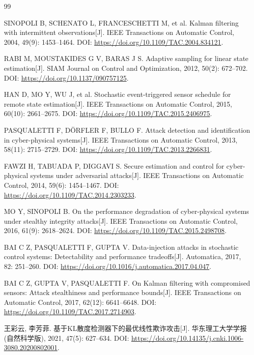 \begin{thebibliography}{99}

SINOPOLI B, SCHENATO L, FRANCESCHETTI M, et al.
Kalman filtering with intermittent observations[J].
IEEE Transactions on Automatic Control, 2004, 49(9): 1453--1464.
DOI: \url{https://doi.org/10.1109/TAC.2004.834121}.

RABI M, MOUSTAKIDES G V, BARAS J S.
Adaptive sampling for linear state estimation[J].
SIAM Journal on Control and Optimization, 2012, 50(2): 672--702.
DOI: \url{https://doi.org/10.1137/090757125}.

HAN D, MO Y, WU J, et al.
Stochastic event-triggered sensor schedule for remote state estimation[J].
IEEE Transactions on Automatic Control, 2015, 60(10): 2661--2675.
DOI: \url{https://doi.org/10.1109/TAC.2015.2406975}.

PASQUALETTI F, D\"ORFLER F, BULLO F.
Attack detection and identification in cyber-physical systems[J].
IEEE Transactions on Automatic Control, 2013, 58(11): 2715--2729.
DOI: \url{https://doi.org/10.1109/TAC.2013.2266831}.

FAWZI H, TABUADA P, DIGGAVI S.
Secure estimation and control for cyber-physical systems under adversarial attacks[J].
IEEE Transactions on Automatic Control, 2014, 59(6): 1454--1467.
DOI: \url{https://doi.org/10.1109/TAC.2014.2303233}.

MO Y, SINOPOLI B.
On the performance degradation of cyber-physical systems under stealthy integrity attacks[J].
IEEE Transactions on Automatic Control, 2016, 61(9): 2618--2624.
DOI: \url{https://doi.org/10.1109/TAC.2015.2498708}.

BAI C Z, PASQUALETTI F, GUPTA V.
Data-injection attacks in stochastic control systems: Detectability and performance tradeoffs[J].
Automatica, 2017, 82: 251--260.
DOI: \url{https://doi.org/10.1016/j.automatica.2017.04.047}.

BAI C Z, GUPTA V, PASQUALETTI F.
On Kalman filtering with compromised sensors: Attack stealthiness and performance bounds[J].
IEEE Transactions on Automatic Control, 2017, 62(12): 6641--6648.
DOI: \url{https://doi.org/10.1109/TAC.2017.2714903}.

王彩云, 李芳菲.
基于KL散度检测器下的最优线性欺诈攻击[J].
华东理工大学学报(自然科学版), 2021, 47(5): 627--634.
DOI: \url{https://doi.org/10.14135/j.cnki.1006-3080.20200802001}.


\end{thebibliography}
